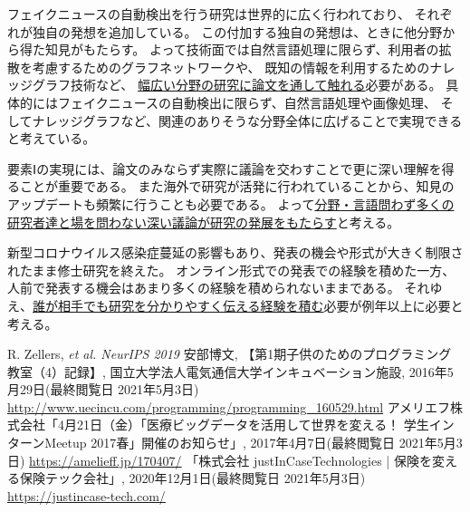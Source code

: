 \vspace{5mm}
\noindent
{}
フェイクニュースの自動検出を行う研究は世界的に広く行われており、
それぞれが独自の発想を追加している。
この付加する独自の発想は、ときに他分野から得た知見がもたらす。
よって技術面では自然言語処理に限らず、利用者の拡散を考慮するためのグラフネットワークや、
既知の情報を利用するためのナレッジグラフ技術など、
\underline{幅広い分野の研究に論文を通して触れる}必要がある。
具体的にはフェイクニュースの自動検出に限らず、自然言語処理や画像処理、
そしてナレッジグラフなど、関連のありそうな分野全体に広げることで実現できると考えている。

要素Ⅰの実現には、論文のみならず実際に議論を交わすことで更に深い理解を得ることが重要である。
また海外で研究が活発に行われていることから、知見のアップデートも頻繁に行うことも必要である。
よって\underline{分野・言語問わず多くの研究者達と場を問わない深い議論が研究の発展をもたらす}と考える。

新型コロナウイルス感染症蔓延の影響もあり、発表の機会や形式が大きく制限されたまま修士研究を終えた。
オンライン形式での発表での経験を積めた一方、人前で発表する機会はあまり多くの経験を積められないままである。
それゆえ、\underline{誰が相手でも研究を分かりやすく伝える経験を積む}必要が例年以上に必要と考える。

{\footnotesize
	\begin{thebibliography}{99}
		\setcounter{enumiv}{13}
		 R. Zellers, \textit{et al. NeurIPS 2019}
         安部博文, 【第1期子供のためのプログラミング教室（4）記録】, 国立大学法人電気通信大学インキュベーション施設, 2016年5月29日(最終閲覧日 2021年5月3日) \url{http://www.uecincu.com/programming/programming_160529.html}
         アメリエフ株式会社「4月21日（金）「医療ビッグデータを活用して世界を変える！ 学生インターンMeetup 2017春」開催のお知らせ」, 2017年4月7日(最終閲覧日 2021年5月3日) \url{https://amelieff.jp/170407/}
         「株式会社 justInCaseTechnologies | 保険を変える保険テック会社」, 2020年12月1日(最終閲覧日 2021年5月3日) \url{https://justincase-tech.com/}
	\end{thebibliography}
}


